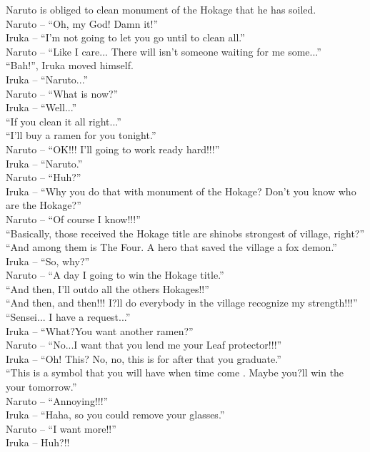 \documentclass[
10pt,				%
openright,			%
oneside,			%
a5paper,			%
brazil,				%
french,				%
english,			%
sumario=tradicional
]{abntex2}
\begin{document}
Naruto is obliged to clean monument of the Hokage that he has soiled.\\
Naruto -- \enquote{Oh, my God! Damn it!}\\
Iruka -- \enquote{I'm not going to let you go until to clean all.}\\
Naruto -- \enquote{Like I care... There will isn't someone waiting for me some...}\\
\enquote{Bah!}, Iruka moved himself.\\
Iruka -- \enquote{Naruto...}\\
Naruto -- \enquote{What is now?}\\
Iruka -- \enquote{Well...}\\
\enquote{If you clean it all right...}\\
\enquote{I'll buy a ramen  for you tonight.}\\
Naruto -- \enquote{OK!!! I'll going to work ready hard!!!}\\
Iruka -- \enquote{Naruto.}\\
Naruto -- \enquote{Huh?}\\
Iruka -- \enquote{Why you do that with monument of the Hokage? Don't you know who are the Hokage?}\\
Naruto -- \enquote{Of course I know!!!}\\
\enquote{Basically, those received the Hokage title are shinobs strongest of village, right?}\\
\enquote{And among them is The Four. A hero that saved the village a fox demon.}\\
Iruka -- \enquote{So, why?}\\
Naruto -- \enquote{A day I going to win the Hokage title.}\\
\enquote{And then, I'll outdo all the others Hokages!!}\\
\enquote{And then, and then!!! I?ll do everybody in the village recognize my strength!!!}\\
\enquote{Sensei... I have a request...}\\
Iruka -- \enquote{What?You want another ramen?}\\
Naruto -- \enquote{No...I want that you lend me your Leaf protector!!!}\\
Iruka -- \enquote{Oh! This? No, no, this is for after that you graduate.}\\
\enquote{This is a symbol that you will have when time come . Maybe you?ll win the your tomorrow.}\\
Naruto -- \enquote{Annoying!!!}\\
Iruka -- \enquote{Haha, so you could remove your glasses.}\\
Naruto -- \enquote{I want more!!}\\
Iruka -- Huh?!!\\
\end{document}

